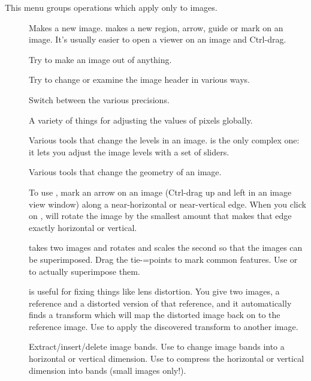 This menu groups operations which apply only to images.

\begin{description}

\item[]
	Makes a new image.  makes a new region, arrow,
	guide or mark on an image. It's usually easier to open a viewer on
	an image and Ctrl-drag.

\item[]
	Try to make an image out of anything.

\item[]
	Try to change or examine the image header in various ways.

\item[]
	Switch between the various precisions.

\item[]
	A variety of things for adjusting the values of pixels globally.

\item[]
	Various tools that change the levels in an image.  is
	the only complex one: it lets you adjust the image levels with a set
	of sliders.

\item[]
	Various tools that change the geometry of an image. 

	To use , mark an arrow on an image
	(Ctrl-drag up and left in an image view window) along a
	near-horizontal or near-vertical edge. When you click on
	, \nip{} will rotate the image by the
	smallest amount that makes that edge exactly horizontal or vertical.

	 takes two images and rotates and scales
	the second so that the images can be superimposed. Drag the
	tie-=points to mark common features. Use 
	or  to actually superimpose them.

	 is useful for fixing things like lens distortion.
	You give  two images, a reference and a distorted version
	of that reference, and it automatically finds a transform which
	will map the distorted image back on to the reference image. Use
	 to apply the discovered transform to another image.

\item[]
	Extract/insert/delete image bands. Use  to change
	image bands into a horizontal or vertical dimension. Use  to compress the horizontal or vertical dimension into bands
	(small images only!).


\end{description}
